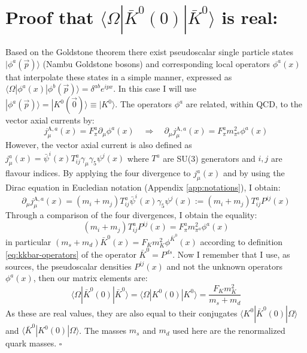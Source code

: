 \documentclass[english, LaM, oneside, noexaminfo]{sapthesis}
\newcommand{\la}{\langle}
\newcommand{\ra}{\rangle}
\newcommand{\proved}{\newline \hspace*{.97\textwidth} $\square$}
\begin{document}
\section{Proof that $\la \Omega | \bar K^0 (0) | \bar K^0 \ra$ is real:}\label{app:proof-reality}
\noindent
Based on the Goldstone theorem \cite{Goldstone-Theorem} there exist pseudoscalar single particle states $| \phi^a (\vec p) \ra$ (Nambu Goldstone bosons) and corresponding local operators $\phi^a(x)$ that interpolate these states in a simple manner, expressed as $\la\Omega | \phi^a (x) | \phi^b (\vec p) \ra = \delta^{ab}e^{ipx} $.
In this case I will use $|\phi^a(\vec p)\ra = | K^0 (\vec 0)\ra \equiv | K^0 \ra$.
The operators $\phi^a$ are related, within QCD, to the vector axial currents by:
\begin{equation*}
    j_\mu^{\text{A},a} (x) = F_\pi^a \partial_\mu \phi^a (x)
    \quad \Rightarrow \quad
    \partial_\mu j_\mu^{\text{A},a} (x) = F_\pi^a m_{\pi^a}^2 \phi^a (x)
\end{equation*}
However, the vector axial current is also defined as $j_\mu^a(x) = \bar \psi^i (x) T^a_{ij}\gamma_\mu \gamma_5 \psi^j (x)$ where $T^a$ are SU(3) generators and $i,j$ are flavour indices.
By applying the four divergence to $j_\mu^a(x)$ and by using the Dirac equation in Eucledian notation (Appendix \ref{app:notations}), I obtain:
\begin{equation*}
    \partial_\mu j_\mu^{\text{A},a} (x) = (m_i + m_j) T^a_{ij}\bar\psi^i (x) \gamma_5 \psi^j (x) := (m_i + m_j) T^a_{ij} P^{ij}(x)
\end{equation*}
Through a comparison of the four divergences, I obtain the equality:
\begin{equation*}
    (m_i + m_j) T^a_{ij} P^{ij}(x) = F_\pi^a m_{\pi^a}^2 \phi^a (x)
\end{equation*}
in particular $(m_s + m_d) \bar K^0(x) = F_K m_{K}^2 \phi^{\bar K^0} (x)$ according to definition \ref{eq:kkbar-operators} of the operator $\bar K^0 = P^{ds}$.
Now I remember that I use, as sources, the pseudoscalar densities $P^{ij}(x)$ and not the unknown operators $\phi^a (x)$, then our matrix elements are:
\begin{equation*}
    \la \Omega | \bar K^0 (0) |  \bar K^0 \ra = \la \Omega | K^0 (0) | K^0 \ra = \frac{F_K m_K^2}{m_s + m_d}
\end{equation*}
As these are real values, they are also equal to their conjugates  $\la K^0  | \bar K^0 (0) |  \Omega\ra$ and $\la\bar K^0 | K^0 (0) | \Omega\ra$.
The masses $m_s$ and $m_d$ used here are the renormalized quark masses.
\proved
\end{document}
